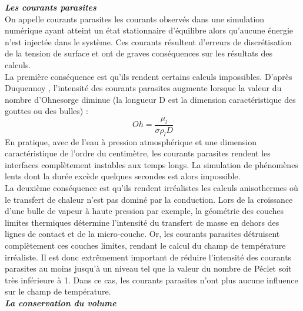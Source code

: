 \textit{\textbf{Les courants parasites}}\smallskip \\

On appelle courants parasites les courants observ\'es dans une simulation num\'erique ayant atteint un \'etat stationnaire d'\'equilibre alors qu'aucune \'energie n'est inject\'ee dans le syst\`eme. Ces courants r\'esultent d'erreurs de discr\'etisation de la tension de surface et ont de graves cons\'equences sur les r\'esultats des calculs.\\
La première cons\'equence est qu'ils rendent certains calculs impossibles. D'apr\`es Duquennoy \cite{Duquennoy2000}, l'intensit\'e des courants parasites augmente lorsque la valeur du nombre d'Ohnesorge diminue (la longueur D est la dimension caract\'eristique des gouttes ou des bulles) :
\begin{equation}
Oh = \dfrac{\mu_{l}}{\sigma \rho_{l} D}
\end{equation}
En pratique, avec de l'eau \`a pression atmosph\'erique et une dimension caract\'eristique de l'ordre du centim\`etre, les courants parasites rendent les interfaces compl\`etement instables aux temps longs. La simulation de
ph\'enom\`enes lents dont la dur\'ee exc\`ede quelques secondes est alors impossible.\\
La deuxi\`eme cons\'equence est qu'ils rendent irr\'ealistes les calculs anisothermes o\`u le transfert de chaleur n'est pas domin\'e par la conduction. Lors de la croissance d'une bulle de vapeur \`a haute pression par exemple, la g\'eom\'etrie des couches limites thermiques d\'etermine l'intensit\'e du transfert de masse en dehors des lignes de contact et de la micro-couche. Or, les courants parasites d\'etruisent complètement ces couches limites, rendant le calcul du champ de temp\'erature irr\'ealiste.
Il est donc extr\^emement important de r\'eduire l'intensit\'e des courants parasites au moins jusqu'\`a un niveau tel que la valeur du nombre de P\'eclet soit tr\`es inf\'erieure \`a 1. Dans ce cas, les courants parasites n'ont plus aucune influence sur le champ de temp\'erature.\smallskip \\

\textit{\textbf{La conservation du volume}}\smallskip \\

